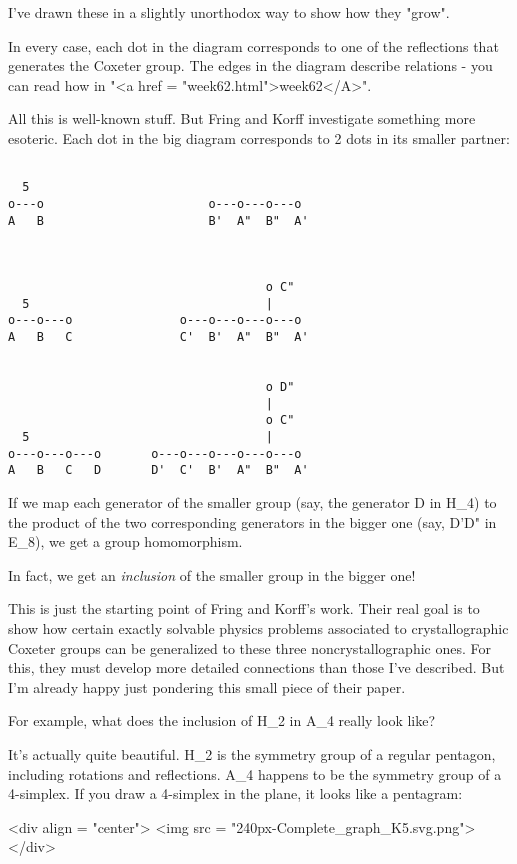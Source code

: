 I've drawn these in a slightly unorthodox way to show how they
"grow".

In every case, each dot in the diagram corresponds to one of the
reflections that generates the Coxeter group.  The edges in the
diagram describe relations - you can read how in "<a href =
"week62.html">week62</A>".

All this is well-known stuff.  But Fring and Korff investigate
something more esoteric.  Each dot in the big diagram corresponds to 
2 dots in its smaller partner:


\begin{verbatim}

  5
o---o                       o---o---o---o
A   B                       B'  A"  B"  A'



                                    o C"
  5                                 |
o---o---o               o---o---o---o---o
A   B   C               C'  B'  A"  B"  A'


                                    o D"
                                    |
                                    o C"
  5                                 |
o---o---o---o       o---o---o---o---o---o
A   B   C   D       D'  C'  B'  A"  B"  A'
\end{verbatim}
    

If we map each generator of the smaller group (say, the generator D in
H_{4}) to the product of the two corresponding generators in
the bigger one (say, D'D" in E_{8}), we get a group
homomorphism.

In fact, we get an \emph{inclusion} of the smaller group in the bigger
one! 

This is just the starting point of Fring and Korff's work.  Their 
real goal is to show how certain exactly solvable physics problems
associated to crystallographic Coxeter groups can be generalized to
these three noncrystallographic ones.  For this, they must develop
more detailed connections than those I've described.  But I'm already
happy just pondering this small piece of their paper.

For example, what does the inclusion of H_{2} in A_{4}
really look like?

It's actually quite beautiful.  H_{2} is the symmetry group of a
regular pentagon, including rotations and reflections.  A_{4} happens
to be the symmetry group of a 4-simplex.  If you draw a 4-simplex
in the plane, it looks like a pentagram:

<div align = "center">
<img src = "240px-Complete_graph_K5.svg.png">
</div>

